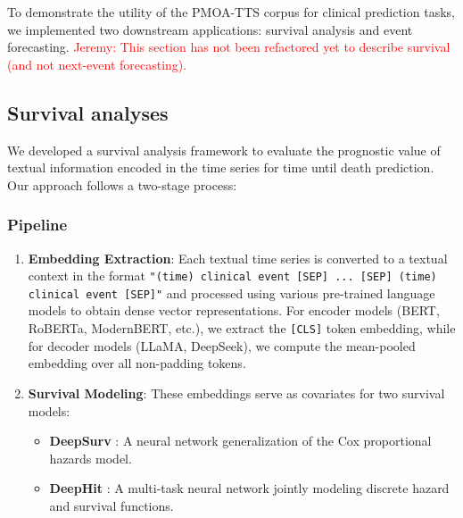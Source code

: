 To demonstrate the utility of the PMOA-TTS corpus for clinical prediction tasks, we implemented two downstream applications: survival analysis and event forecasting. \textcolor{red}{Jeremy: This section has not been refactored yet to describe survival (and not next-event forecasting).}

\subsection{Survival analyses}

We developed a survival analysis framework to evaluate the prognostic value of textual information encoded in the time series for time until death prediction. 
Our approach follows a two-stage process:


\subsubsection{Pipeline}

\begin{enumerate}
\item \textbf{Embedding Extraction}: Each textual time series is converted to a textual context in the format \texttt{"(time) clinical event [SEP] ... [SEP] (time) clinical event [SEP]"} and processed using various pre-trained language models to obtain dense vector representations. 
For encoder models (BERT, RoBERTa, ModernBERT, etc.), we extract the \texttt{[CLS]} token embedding, while for decoder models (LLaMA, DeepSeek), we compute the mean-pooled embedding over all non-padding tokens.

\item \textbf{Survival Modeling}: These embeddings serve as covariates for two survival models:
\begin{itemize}
    \item \textbf{DeepSurv} \citep{katzman2018deepsurv}: A neural network generalization of the Cox proportional hazards model.
    \item \textbf{DeepHit} \citep{lee2018deephit}: A multi-task neural network jointly modeling discrete hazard and survival functions.
\end{itemize}
\end{enumerate}

